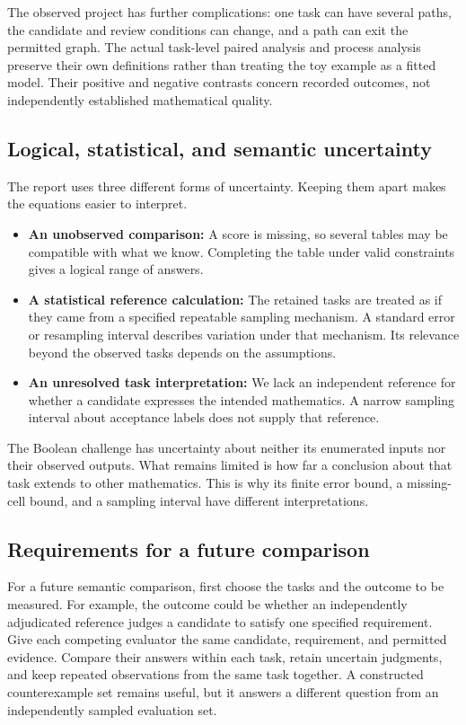 The observed project has further complications: one task can have several paths, the candidate and review conditions can change, and a path can exit the permitted graph. The actual task-level paired analysis and process analysis preserve their own definitions rather than treating the toy example as a fitted model. Their positive and negative contrasts concern recorded outcomes, not independently established mathematical quality.

\subsection{Logical, statistical, and semantic uncertainty}
\label{subsec:uncertainty}
The report uses three different forms of uncertainty. Keeping them apart makes the equations easier to interpret.
\begin{itemize}[leftmargin=*]
\item \textbf{An unobserved comparison:} A score is missing, so several tables may be compatible with what we know. Completing the table under valid constraints gives a logical range of answers.
\item \textbf{A statistical reference calculation:} The retained tasks are treated as if they came from a specified repeatable sampling mechanism. A standard error or resampling interval describes variation under that mechanism. Its relevance beyond the observed tasks depends on the assumptions.
\item \textbf{An unresolved task interpretation:} We lack an independent reference for whether a candidate expresses the intended mathematics. A narrow sampling interval about acceptance labels does not supply that reference.
\end{itemize}
The Boolean challenge has uncertainty about neither its enumerated inputs nor their observed outputs. What remains limited is how far a conclusion about that task extends to other mathematics. This is why its finite error bound, a missing-cell bound, and a sampling interval have different interpretations.

\subsection{Requirements for a future comparison}
\label{subsec:future-design}
For a future semantic comparison, first choose the tasks and the outcome to be measured. For example, the outcome could be whether an independently adjudicated reference judges a candidate to satisfy one specified requirement. Give each competing evaluator the same candidate, requirement, and permitted evidence. Compare their answers within each task, retain uncertain judgments, and keep repeated observations from the same task together. A constructed counterexample set remains useful, but it answers a different question from an independently sampled evaluation set.

